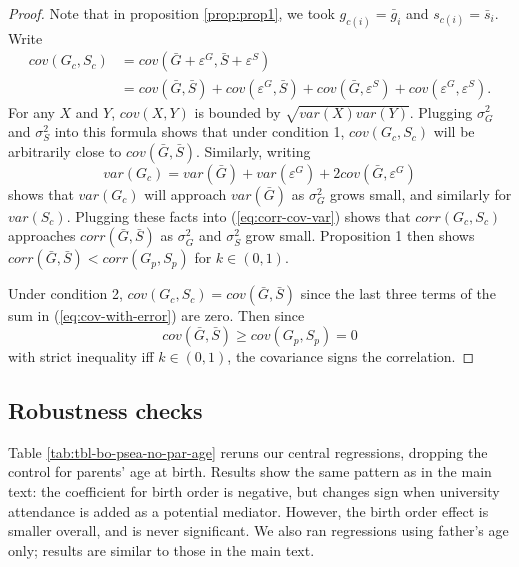 \documentclass[
]{article}
\begin{document}
\begin{proof}

Note that in proposition \ref{prop:prop1}, we took $g_{c(i)} = \bar{g}_{i}$ and $s_{c(i)} = \bar{s}_i$. Write 
\begin{align}
cov(G_{c},S_{c}) & =cov(\bar{G}+\varepsilon^{G},\bar{S}+\varepsilon^{S})\nonumber \\
 & = cov(\bar{G},\bar{S}) + cov(\varepsilon^{G},\bar{S}) + 
     cov(\bar{G},\varepsilon^{S}) + cov(\varepsilon^{G},\varepsilon^{S}).
 \label{eq:cov-with-error}
\end{align}
For any $X$ and $Y$, $cov(X, Y)$ is bounded by $\sqrt{var(X) var(Y)}$.
Plugging $\sigma_{G}^{2}$ and $\sigma_{S}^{2}$ into this formula
shows that under condition 1, $cov(G_{c},S_{c})$ will be arbitrarily
close to $cov(\bar{G},\bar{S})$. Similarly, writing
\[
var(G_{c}) = var(\bar{G}) + var(\varepsilon^{G}) + 2cov(\bar{G},\varepsilon^{G})
\]
shows that $var(G_{c})$ will approach $var(\bar{G})$ as $\sigma_{G}^{2}$
grows small, and similarly for $var(S_{c})$. Plugging these facts
into (\ref{eq:corr-cov-var}) shows that $corr(G_{c},S_{c})$ approaches
$corr(\bar{G},\bar{S})$ as $\sigma_{G}^{2}$ and $\sigma_{S}^{2}$
grow small. Proposition 1 then shows $corr(\bar{G},\bar{S}) < corr(G_{p},S_{p})$
for $k\in(0,1)$.

Under condition 2, $cov(G_{c}, S_{c}) = cov(\bar{G},\bar{S})$ since
the last three terms of the sum in (\ref{eq:cov-with-error}) are
zero. Then since 
\[
cov(\bar{G},\bar{S})\ge cov(G_{p},S_{p}) = 0
\]
with strict inequality iff $k\in(0,1)$, the covariance signs the
correlation. 

\end{proof}

\FloatBarrier

\newpage

\hypertarget{robustness-checks}{%
\subsection{Robustness checks}\label{robustness-checks}}

Table \ref{tab:tbl-bo-psea-no-par-age} reruns our central regressions,
dropping the control for parents' age at birth. Results show the same
pattern as in the main text: the coefficient for birth order is
negative, but changes sign when university attendance is added as a
potential mediator. However, the birth order effect is smaller overall,
and is never significant. We also ran regressions using father's age
only; results are similar to those in the main text.
\end{document}
